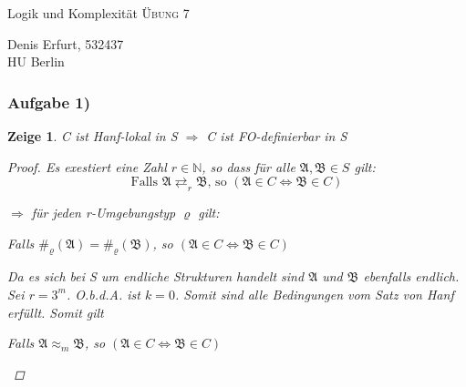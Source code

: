 \documentclass[12pt]{article}
\newtheorem{zeige}{Zeige}
\begin{document}
\begin{center}
\Large
Logik und Komplexität  \textsc{ Übung 7 }
\end{center}

\begin{flushright}
Denis Erfurt, 532437\\
HU Berlin \\

\vspace{2 mm}

\end{flushright}

\subsubsection*{Aufgabe 1)}
\begin{zeige}
  C ist Hanf-lokal in S $\Rightarrow $ C ist FO-definierbar in S
\begin{proof}
  
  Es exestiert eine Zahl $r\in\mathbb{N}$, so dass für alle $\mathfrak{A},\mathfrak{B}\in S$ gilt: 
  \[ \text{Falls } \mathfrak{A} \rightleftarrows_r \mathfrak{B} \text{, so } (\mathfrak{A}\in C \Leftrightarrow \mathfrak{B}\in C ) \] 

  $\Rightarrow $ für jeden r-Umgebungstyp $\varrho$ gilt:
  \begin{center}
    Falls $\#_\varrho(\mathfrak{A}) = \#_\varrho (\mathfrak{B})$, so $(\mathfrak{A}\in C \Leftrightarrow \mathfrak{B}\in C )$\\
  \end{center}
  

  
  
  Da es sich bei S um endliche Strukturen handelt sind $\mathfrak{A}$ und $\mathfrak{B}$ ebenfalls endlich. Sei $r=3^m$.
  O.b.d.A. ist $k=0$. Somit sind alle Bedingungen vom Satz von Hanf erfüllt. Somit gilt 
  \begin{center}
    Falls $\mathfrak{A} \approx_m \mathfrak{B}$, so $(\mathfrak{A}\in C \Leftrightarrow \mathfrak{B}\in C )$
  \end{center}
  

\end{proof}
\end{zeige}
\end{document}
